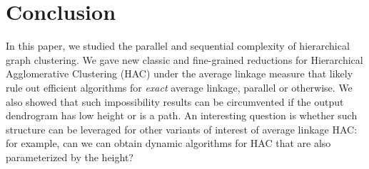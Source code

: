 \documentclass[11pt]{article}
\begin{document}





\section{Conclusion}
In this paper, we studied the parallel and sequential complexity of hierarchical
graph clustering. We gave new classic and fine-grained reductions for Hierarchical Agglomerative Clustering (HAC) under the average linkage
measure that likely rule out efficient algorithms for {\em exact} average linkage, parallel or otherwise. 
We also showed that such impossibility results can be circumvented if the output dendrogram has low height or is a path. An interesting question is whether such structure can be leveraged for other variants of interest of average linkage HAC: for example, can we can obtain dynamic algorithms for HAC that are also parameterized by the height?
\end{document}
